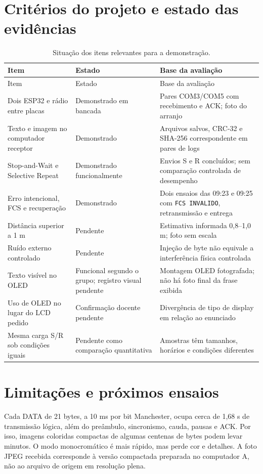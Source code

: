 \documentclass[12pt,a4paper]{article}
\begin{document}
\section{Critérios do projeto e estado das evidências}
\begin{longtable}{p{5cm}p{3cm}p{5cm}}
\caption{Situação dos itens relevantes para a demonstração.}\label{tab:criterios}\\
\toprule
Item & Estado & Base da avaliação \\
\midrule
\endfirsthead
\toprule Item & Estado & Base da avaliação \\ \midrule
\endhead
Dois ESP32 e rádio entre placas & Demonstrado em bancada & Pares COM3/COM5 com recebimento e ACK; foto do arranjo \\
Texto e imagem no computador receptor & Demonstrado & Arquivos salvos, CRC-32 e SHA-256 correspondente em pares de logs \\
Stop-and-Wait e Selective Repeat & Demonstrado funcionalmente & Envios S e R concluídos; sem comparação controlada de desempenho \\
Erro intencional, FCS e recuperação & Demonstrado & Dois ensaios das 09:23 e 09:25 com \texttt{FCS INVALIDO}, retransmissão e entrega \\
Distância superior a 1 m & Pendente & Estimativa informada 0,8--1,0 m; foto sem escala \\
Ruído externo controlado & Pendente & Injeção de byte não equivale a interferência física controlada \\
Texto visível no OLED & Funcional segundo o grupo; registro visual pendente & Montagem OLED fotografada; não há foto final da frase exibida \\
Uso de OLED no lugar do LCD pedido & Confirmação docente pendente & Divergência de tipo de display em relação ao enunciado \\
Mesma carga S/R sob condições iguais & Pendente como comparação quantitativa & Amostras têm tamanhos, horários e condições diferentes \\
\bottomrule
\end{longtable}

\section{Limitações e próximos ensaios}
Cada DATA de 21 bytes, a 10 ms por bit Manchester, ocupa cerca de 1,68 s de transmissão lógica, além do preâmbulo, sincronismo, cauda, pausas e ACK. Por isso, imagens coloridas compactas de algumas centenas de bytes podem levar minutos. O modo monocromático é mais rápido, mas perde cor e detalhes. A foto JPEG recebida corresponde à versão compactada preparada no computador A, não ao arquivo de origem em resolução plena.
\end{document}
